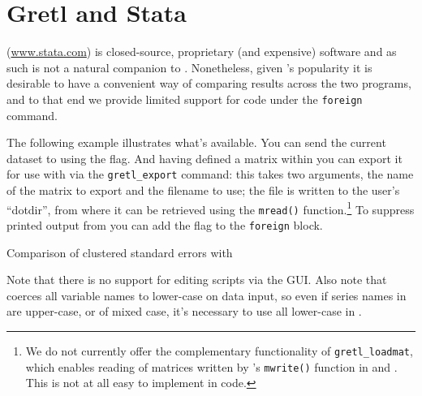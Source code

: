 \chapter{Gretl and Stata}
\label{chap:gretlStata}

 (\url{www.stata.com}) is closed-source, proprietary (and
expensive) software and as such is not a natural companion to
. Nonetheless, given 's popularity it is
desirable to have a convenient way of comparing results across the two
programs, and to that end we provide limited support for 
code under the \texttt{foreign} command.

The following example illustrates what's available. You can send the
current  dataset to  using the
 flag. And having defined a matrix within
 you can export it for use with  via the
\verb|gretl_export| command: this takes two arguments, the name of the
matrix to export and the filename to use; the file is written to the
user's ``dotdir'', from where it can be retrieved using the
\texttt{mread()} function.\footnote{We do not currently offer the
  complementary functionality of \verb|gretl_loadmat|, which enables
  reading of matrices written by 's \texttt{mwrite()}
  function in  and . This is not at all easy to
  implement in  code.} To suppress printed output
from  you can add the  flag to the
\texttt{foreign} block.


\begin{script}[htbp]
  \caption{Comparison of clustered standard errors with }
\label{Stata-test}
\end{script}

Note that there is no support for editing  scripts via the
 GUI. Also note that  coerces all variable
names to lower-case on data input, so even if series names in
 are upper-case, or of mixed case, it's necessary to use
all lower-case in . 


